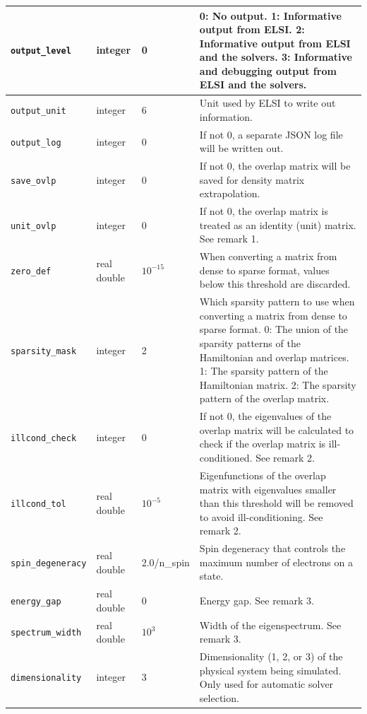 \documentclass{report}
\begin{document}
\begin{longtable}[]{|p{30mm}|p{20mm}|p{15mm}|p{97mm}|}
\hline
\texttt{output\_level}       & integer     & 0           & 0: No output. 1: Informative output from ELSI. 2: Informative output from ELSI and the solvers. 3: Informative and debugging output from ELSI and the solvers.\\
\hline
\texttt{output\_unit}        & integer     & 6           & Unit used by ELSI to write out information.\\
\hline
\texttt{output\_log}         & integer     & 0           & If not 0, a separate JSON log file will be written out.\\
\hline
\texttt{save\_ovlp}          & integer     & 0           & If not 0, the overlap matrix will be saved for density matrix extrapolation.\\
\hline
\texttt{unit\_ovlp}          & integer     & 0           & If not 0, the overlap matrix is treated as an identity (unit) matrix. See remark 1.\\
\hline
\texttt{zero\_def}           & real double & $10^{-15}$  & When converting a matrix from dense to sparse format, values below this threshold are discarded.\\
\hline
\texttt{sparsity\_mask}      & integer     & 2           & Which sparsity pattern to use when converting a matrix from dense to sparse format. 0: The union of the sparsity patterns of the Hamiltonian and overlap matrices. 1: The sparsity pattern of the Hamiltonian matrix. 2: The sparsity pattern of the overlap matrix.\\
\hline
\texttt{illcond\_check}      & integer     & 0           & If not 0, the eigenvalues of the overlap matrix will be calculated to check if the overlap matrix is ill-conditioned. See remark 2.\\
\hline
\texttt{illcond\_tol}        & real double & $10^{-5}$   & Eigenfunctions of the overlap matrix with eigenvalues smaller than this threshold will be removed to avoid ill-conditioning. See remark 2.\\
\hline
\texttt{spin\_degeneracy}    & real double & 2.0/n\_spin & Spin degeneracy that controls the maximum number of electrons on a state.\\
\hline
\texttt{energy\_gap}         & real double & 0           & Energy gap. See remark 3.\\
\hline
\texttt{spectrum\_width}     & real double & $10^{3}$    & Width of the eigenspectrum. See remark 3.\\
\hline
\texttt{dimensionality}      & integer     & 3           & Dimensionality (1, 2, or 3) of the physical system being simulated. Only used for automatic solver selection.\\

\end{longtable}
\end{document}
